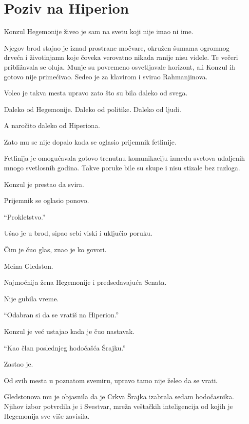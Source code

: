 \chapter{Poziv na Hiperion}


Konzul Hegemonije živeo je sam na svetu koji nije imao ni ime.

Njegov brod stajao je iznad prostrane močvare, okružen šumama ogromnog drveća i životinjama koje čoveka verovatno nikada ranije nisu videle. Te večeri približavala se oluja. Munje su povremeno osvetljavale horizont, ali Konzul ih gotovo nije primećivao. Sedeo je za klavirom i svirao Rahmanjinova.

Voleo je takva mesta upravo zato što su bila daleko od svega.

Daleko od Hegemonije. Daleko od politike. Daleko od ljudi.

A naročito daleko od Hiperiona.

Zato mu se nije dopalo kada se oglasio prijemnik fetlinije.

Fetlinija je omogućavala gotovo trenutnu komunikaciju između svetova udaljenih mnogo svetlosnih godina. Takve poruke bile su skupe i nisu stizale bez razloga.

Konzul je prestao da svira.

Prijemnik se oglasio ponovo.

``Prokletstvo.''

Ušao je u brod, sipao sebi viski i uključio poruku.

Čim je čuo glas, znao je ko govori.

Meina Gledston.

Najmoćnija žena Hegemonije i predsedavajuća Senata.

Nije gubila vreme.

``Odabran si da se vratiš na Hiperion.''

Konzul je već ustajao kada je čuo nastavak.

``Kao član poslednjeg hodočašća Šrajku.''

Zastao je.

Od svih mesta u poznatom svemiru, upravo tamo nije želeo da se vrati.

Gledstonova mu je objasnila da je Crkva Šrajka izabrala sedam hodočasnika. Njihov izbor potvrdila je i Svestvar, mreža veštačkih inteligencija od kojih je Hegemonija sve više zavisila.

